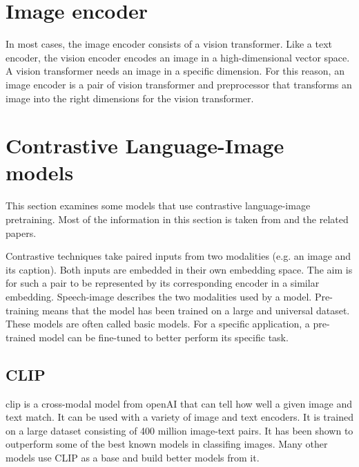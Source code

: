     \section{Image encoder}
    In most cases, the image encoder consists of a vision transformer\cite{Vis_N_Grams}.
    Like a text encoder, the vision encoder encodes an image in a high-dimensional vector space.
    A vision transformer needs an image in a specific dimension.
    For this reason, an image encoder is a pair of vision transformer and preprocessor that transforms an image into the right dimensions for the vision transformer.

    
    \section{Contrastive Language-Image models
        \label{section:languageimagemodels}}
        This section examines some models that use contrastive language-image pretraining.
        Most of the information in this section is taken from \cite{cliplikeweb} and the related papers.

        Contrastive techniques take paired inputs from two modalities (e.g. an image and its caption).
        Both inputs are embedded in their own embedding space.
        The aim is for such a pair to be represented by its corresponding encoder in a similar embedding.
        Speech-image describes the two modalities used by a model.
        Pre-training means that the model has been trained on a large and universal dataset.
        These models are often called basic models.
        For a specific application, a pre-trained model can be fine-tuned to better perform its specific task.

        \subsection{CLIP
            \label{section:clip}}
        \acrfull{clip} \cite{clip} is a cross-modal model from openAI\cite{openai} that can tell how well a given image and text match.
        It can be used with a variety of image and text encoders.
        It is trained on a large dataset consisting of 400 million image-text pairs.
        It has been shown to outperform some of the best known models in classifing images.
        Many other models use CLIP as a base and build better models from it.

